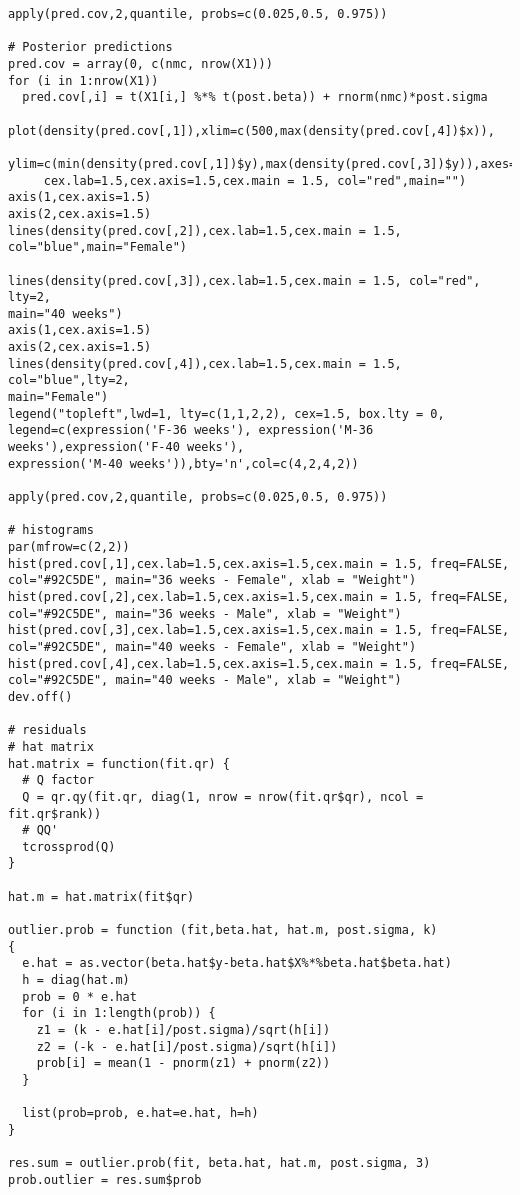 \documentclass[a4paper, 11pt]{article}
\begin{document}
\begin{verbatim}
apply(pred.cov,2,quantile, probs=c(0.025,0.5, 0.975))

# Posterior predictions
pred.cov = array(0, c(nmc, nrow(X1)))
for (i in 1:nrow(X1))
  pred.cov[,i] = t(X1[i,] %*% t(post.beta)) + rnorm(nmc)*post.sigma 

plot(density(pred.cov[,1]),xlim=c(500,max(density(pred.cov[,4])$x)), 
     ylim=c(min(density(pred.cov[,1])$y),max(density(pred.cov[,3])$y)),axes=FALSE,
     cex.lab=1.5,cex.axis=1.5,cex.main = 1.5, col="red",main="")
axis(1,cex.axis=1.5)
axis(2,cex.axis=1.5) 
lines(density(pred.cov[,2]),cex.lab=1.5,cex.main = 1.5, col="blue",main="Female")

lines(density(pred.cov[,3]),cex.lab=1.5,cex.main = 1.5, col="red", lty=2,
main="40 weeks")
axis(1,cex.axis=1.5)
axis(2,cex.axis=1.5) 
lines(density(pred.cov[,4]),cex.lab=1.5,cex.main = 1.5, col="blue",lty=2,
main="Female")
legend("topleft",lwd=1, lty=c(1,1,2,2), cex=1.5, box.lty = 0, 
legend=c(expression('F-36 weeks'), expression('M-36 weeks'),expression('F-40 weeks'),
expression('M-40 weeks')),bty='n',col=c(4,2,4,2))

apply(pred.cov,2,quantile, probs=c(0.025,0.5, 0.975))

# histograms
par(mfrow=c(2,2))
hist(pred.cov[,1],cex.lab=1.5,cex.axis=1.5,cex.main = 1.5, freq=FALSE, 
col="#92C5DE", main="36 weeks - Female", xlab = "Weight")
hist(pred.cov[,2],cex.lab=1.5,cex.axis=1.5,cex.main = 1.5, freq=FALSE, 
col="#92C5DE", main="36 weeks - Male", xlab = "Weight")
hist(pred.cov[,3],cex.lab=1.5,cex.axis=1.5,cex.main = 1.5, freq=FALSE, 
col="#92C5DE", main="40 weeks - Female", xlab = "Weight")
hist(pred.cov[,4],cex.lab=1.5,cex.axis=1.5,cex.main = 1.5, freq=FALSE, 
col="#92C5DE", main="40 weeks - Male", xlab = "Weight")
dev.off()

# residuals
# hat matrix
hat.matrix = function(fit.qr) {
  # Q factor
  Q = qr.qy(fit.qr, diag(1, nrow = nrow(fit.qr$qr), ncol = fit.qr$rank))
  # QQ'
  tcrossprod(Q)
}

hat.m = hat.matrix(fit$qr)

outlier.prob = function (fit,beta.hat, hat.m, post.sigma, k) 
{
  e.hat = as.vector(beta.hat$y-beta.hat$X%*%beta.hat$beta.hat)
  h = diag(hat.m)
  prob = 0 * e.hat
  for (i in 1:length(prob)) {
    z1 = (k - e.hat[i]/post.sigma)/sqrt(h[i])
    z2 = (-k - e.hat[i]/post.sigma)/sqrt(h[i])
    prob[i] = mean(1 - pnorm(z1) + pnorm(z2))
  }
  
  list(prob=prob, e.hat=e.hat, h=h)
}

res.sum = outlier.prob(fit, beta.hat, hat.m, post.sigma, 3)
prob.outlier = res.sum$prob


\end{verbatim}
\end{document}
